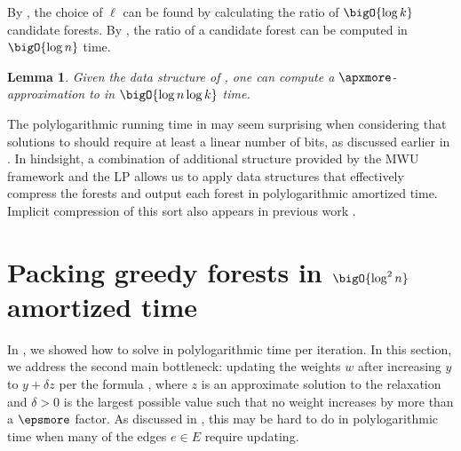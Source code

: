 \documentclass[11pt]{article}
\numberwithin{equation}{section}
\newtheorem{lemma}[theorem]{Lemma}
\theoremstyle{definition}
\theoremstyle{plain}
\begin{document}
By , the choice of $\ell$ can be found by
calculating the ratio of $\bigO{\log k}$ candidate forests. By
, the ratio of a candidate forest can be
computed in $\bigO{\log n}$ time.

\begin{lemma}
   Given the data structure of
  , one can compute a
$\apxmore$-approximation   %
to  in $\bigO{\log n \log k}$
 time.
\end{lemma}

The polylogarithmic running time in 
%
may seem %
surprising when considering that solutions to 
should require at least a linear number of bits, as discussed earlier
in . In hindsight, a combination of additional
structure provided by the MWU framework and the LP
 allows us to apply data structures that
effectively compress the forests and output each forest in
polylogarithmic amortized time. Implicit compression of this sort also
appears in previous work \cite{cq-17-soda,cq-17-focs,cq-19}.

\section{Packing greedy forests in $\bigO{\log^2 n}$ amortized time}


In , we showed how to solve
 in polylogarithmic time per iteration.  In
this section, we address the second main bottleneck: updating the
weights $w$ after increasing $y$ to $y + \delta z$ per the formula
, where $z$ is an approximate solution to the
relaxation  and $\delta > 0$ is the largest
possible value such that no weight increases by more than a
%
$\epsmore$ factor.   %
As discussed in
, this may be hard to do in polylogarithmic
time when many of the edges $e \in E$ require updating.
\end{document}
